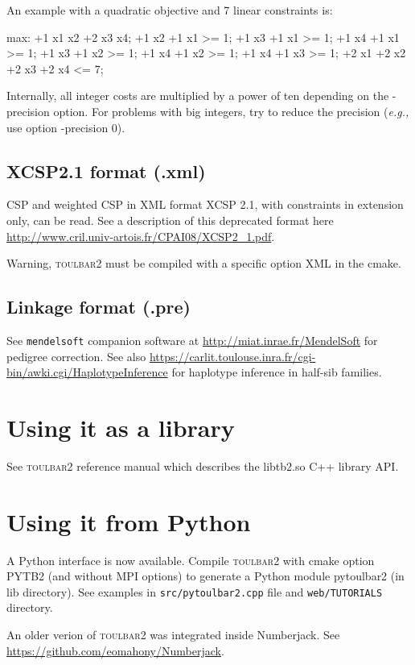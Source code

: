 \documentclass{article}
\def\toulbar2{\textsc{toulbar2}}
\begin{document}
An example with a quadratic objective and 7 linear constraints is:
\begin{DoxyCode}
max: +1 x1 x2 +2 x3 x4;
+1 x2 +1 x1 >= 1;
+1 x3 +1 x1 >= 1;
+1 x4 +1 x1 >= 1;
+1 x3 +1 x2 >= 1;
+1 x4 +1 x2 >= 1;
+1 x4 +1 x3 >= 1;
+2 x1 +2 x2 +2 x3 +2 x4 <= 7;
\end{DoxyCode}

Internally, all integer costs are multiplied by a power of ten depending on the -precision option. 
For problems with big integers, try to reduce the precision ({\em e.g.,} use option -precision 0).

\subsection{XCSP2.1 format (.xml)}

CSP and weighted CSP in XML format XCSP 2.1, with constraints in extension only, can be read. See a description of this deprecated format here \url{http://www.cril.univ-artois.fr/CPAI08/XCSP2_1.pdf}.

Warning, \toulbar2 must be compiled with a specific option XML in the cmake.

\subsection{Linkage format (.pre)}

See \texttt{mendelsoft} companion software at \url{http://miat.inrae.fr/MendelSoft} for pedigree correction. See also \url{https://carlit.toulouse.inra.fr/cgi-bin/awki.cgi/HaplotypeInference} for haplotype inference in half-sib families.


\section{Using it as a library}

See \toulbar2 reference manual which describes the libtb2.so C++ library API.

\section{Using it from Python}

A Python interface is now available. Compile \toulbar2 with cmake option PYTB2 (and without MPI options) to generate a Python module {\sc pytoulbar2}
 (in lib directory). See examples in {\tt src/pytoulbar2.cpp} file and {\tt web/TUTORIALS} directory.

An older verion of \toulbar2 was integrated inside Numberjack. See  \url{https://github.com/eomahony/Numberjack}.



\end{document}
